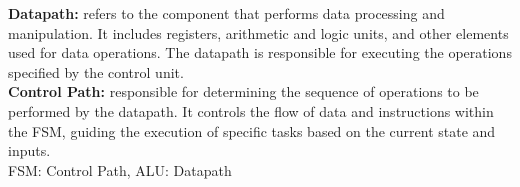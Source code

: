\documentclass{article}
\begin{document}
\noindent\textbf{Datapath:} refers to the component that performs data processing and manipulation. It includes registers, arithmetic and logic units, and other elements used for data operations. The datapath is responsible for executing the operations specified by the control unit.\\
\noindent\textbf{Control Path:} responsible for determining the sequence of operations to be performed by the datapath. It controls the flow of data and instructions within the FSM, guiding the execution of specific tasks based on the current state and inputs.
\\

FSM: Control Path, 
ALU: Datapath
\end{document}
